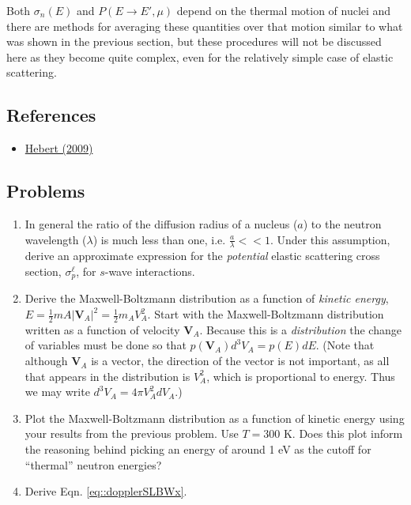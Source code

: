 \documentclass[11pt]{article}
\renewcommand\vec{\mathbf}
\begin{document}
Both \(\sigma_n(E)\) and \(P(E \rightarrow E', \mu)\) depend on the thermal motion of nuclei and there are methods for averaging these quantities over that motion similar to what was shown in the previous section, but these procedures will not be discussed here as they become quite complex, even for the relatively simple case of elastic scattering.
\subsection{References}
\label{sec:orgheadline24}
\begin{itemize}
\item \href{Hebert2009}{Hebert (2009)}
\end{itemize}
\subsection{Problems}
\label{sec:orgheadline25}
\begin{enumerate}
\item In general the ratio of the diffusion radius of a nucleus (\(a\)) to the neutron wavelength (\(\lambda\)) is much less than one, i.e. \(\frac{a}{\lambda} << 1\).  Under this assumption, derive an approximate expression for the \emph{potential} elastic scattering cross section, \(\sigma_p^\ell\), for \(s\)-wave interactions.
\item Derive the Maxwell-Boltzmann distribution as a function of \emph{kinetic energy}, \(E = \frac{1}{2}mA|\vec{V}_A|^2 = \frac{1}{2} m_A V_A^2\). Start with the Maxwell-Boltzmann distribution written as a function of velocity \(\vec{V}_A\).  Because this is a \emph{distribution} the change of variables must be done so that \(p(\vec{V}_A) d^3V_A = p(E) dE\).  (Note that although \(\vec{V}_A\) is a vector, the direction of the vector is not important, as all that appears in the distribution is \(V_A^2\), which is proportional to energy.  Thus we may write \(d^3 V_A = 4\pi V_A^2 dV_A\).)
\item Plot the Maxwell-Boltzmann distribution as a function of kinetic energy using your results from the previous problem.  Use \(T = 300\) K.  Does this plot inform the reasoning behind picking an energy of around 1 eV as the cutoff for ``thermal'' neutron energies?
\item Derive Eqn. \ref{eq::dopplerSLBWx}.
\end{enumerate}
\end{document}
